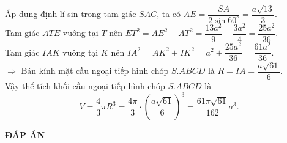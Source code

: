 \begin{ex}
{		Áp dụng định lí sin trong tam giác $SAC$, ta có $AE=\dfrac{SA}{2\sin 60^\circ}=\dfrac{a\sqrt{13}}{3}$.\\
		Tam giác $ATE$ vuông tại $T$ nên $ET^2=AE^2-AT^2=\dfrac{13a^2}{9}-\dfrac{3a^2}{4}=\dfrac{25a^2}{36}$.\\
		Tam giác $IAK$ vuông tại $K$ nên $IA^2=AK^2+IK^2=a^2+\dfrac{25a^2}{36}=\dfrac{61a^2}{36}$.\\
		$\Rightarrow$ Bán kính mặt cầu ngoại tiếp hình chóp $S.ABCD$ là $R=IA=\dfrac{a\sqrt{61}}{6}$.\\
		Vậy thể tích khối cầu ngoại tiếp hình chóp $S.ABCD$ là
		$$V=\dfrac{4}{3}\pi R^3=\dfrac{4\pi}{3}\cdot\left(\dfrac{a\sqrt{61}}{6}\right)^3=\dfrac{61\pi\sqrt{61}}{162}a^3.$$
}
\end{ex}

\newpage
\begin{center}
	\textbf{ĐÁP ÁN}
\end{center}
\begin{multicols}{10}
	 
\end{multicols}